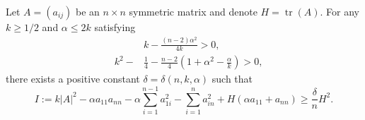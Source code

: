 \documentclass[10pt,a4paper]{amsart}
\DeclareMathOperator{\tr}{tr}
\begin{document}
\begin{proposition}\label{inequalityforAsquare1}
Let $A=(a_{ij})$ be an $n\times n$ symmetric matrix and denote $H=\tr(A)$. For any $k\geq 1/2$ and $\alpha\leq 2k$ satisfying
\begin{equation}\label{assumptions}
\begin{split}
     &k-\frac{(n-2)\alpha^2}{4k}>0,\\
        \quad k^2-&\frac{1}{4}-\frac{n-2}{4}\left(1+\alpha^2-\frac{\alpha}{k}\right)>0,
\end{split}
\end{equation}
there exists a positive constant $\delta=\delta(n,k,\alpha)$ such that \[I:=k|A|^2-\alpha a_{11}a_{nn}-\alpha\sum_{i=1}^{n-1}a_{1i}^2-\sum_{i=1}^na_{in}^2+H(\alpha a_{11}+a_{nn})\geq \frac{\delta}{n}H^2.\]

\end{proposition}
\end{document}
